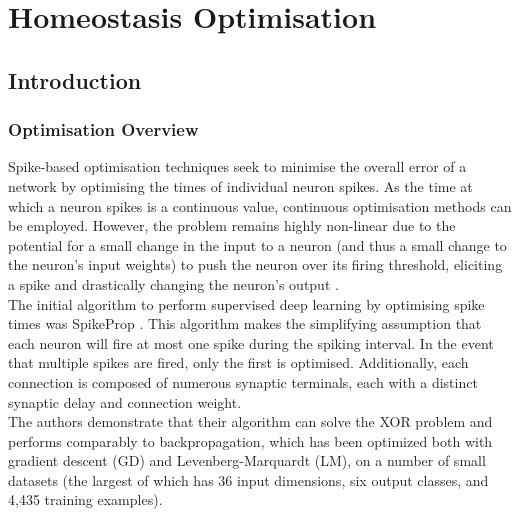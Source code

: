 \chapter{Homeostasis Optimisation}

\section[Introduction]{Introduction}

\subsection[Optimisation Overview]{Optimisation Overview}

Spike-based optimisation techniques seek to minimise the overall error of a network by optimising the times of individual neuron spikes. As the time at which a neuron spikes is a continuous value, continuous optimisation methods can be employed. However, the problem remains highly non-linear due to the potential for a small change in the input to a neuron (and thus a small change to the neuron's input weights) to push the neuron over its firing threshold, eliciting a spike and drastically changing the neuron's output \cite{gutig2014spike}. \\

\noindent The initial algorithm to perform supervised deep learning by optimising spike times was SpikeProp \cite{bohte2002error}. This algorithm makes the simplifying assumption that each neuron will fire at most one spike during the spiking interval. In the event that multiple spikes are fired, only the first is optimised. Additionally, each connection is composed of numerous synaptic terminals, each with a distinct synaptic delay and connection weight. \\

\noindent The authors demonstrate that their algorithm can solve the XOR problem and performs comparably to backpropagation, which has been optimized both with gradient descent (GD) and Levenberg-Marquardt (LM), on a number of small datasets (the largest of which has 36 input dimensions, six output classes, and 4,435 training examples). \\


